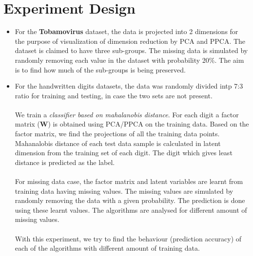 \section{Experiment Design}
\begin{itemize}
\item For the \textbf{Tobamovirus} dataset, the data is projected into 2 dimensions for the purpose of visualization of dimension reduction by PCA and PPCA. The dataset is claimed to have three sub-groups. The missing data is simulated by randomly removing each value in the dataset with probability 20\%. The aim is to find how much of the sub-groups is being preserved. 
\item For the handwritten digits datasets, the data was randomly divided intp 7:3 ratio for training and testing, in case the two sets are not present. \\\\
We train a \emph{classifier based on mahalanobis distance}. For each digit a factor matrix ($\mathbf{W}$) is obtained using PCA/PPCA on the training data. Based on the factor matrix, we find the projections of all the training data points. Mahanalobis distance of each test data sample is calculated in latent dimension from the training set of each digit. The digit which gives least distance is predicted as the label.\\\\
For missing data case, the factor matrix and latent variables are learnt from training data having missing values. The missing values are simulated by randomly removing the data with a given probability. The prediction is done using these learnt values. The algorithms are analysed for different amount of missing values.\\\\
With this experiment, we try to find the behaviour (prediction accuracy) of each of the algorithms with different amount of training data.
\end{itemize}
